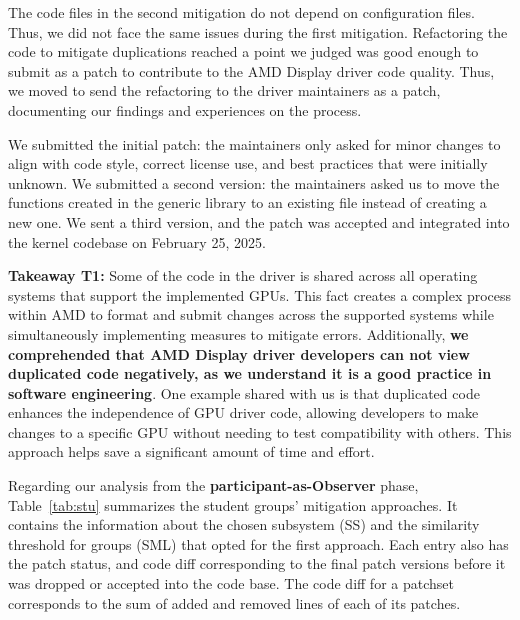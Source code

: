 \documentclass[10pt,conference]{IEEEtran}
\begin{document}
The code files in the second mitigation do not depend on configuration files. Thus, 
we did not face the same issues during the first mitigation. Refactoring the code 
to mitigate duplications reached a point we judged was good enough to submit as a 
patch to contribute to the AMD Display driver code quality. Thus, we moved to send 
the refactoring to the driver maintainers as a patch, documenting our findings and experiences 
on the process.

We submitted the initial patch: the maintainers only asked for minor changes to align with code style, correct license use, and best practices that were initially unknown. We submitted a second version: the maintainers asked us to move the functions created in the generic library to an existing file instead of creating a new one. We sent a third version, and the patch was accepted and integrated into the kernel codebase on February 25, 2025.

\noindent\textbf{Takeaway T1:} Some of the code in the driver is shared across all operating systems that support the implemented GPUs. This fact creates a complex process within AMD to format and submit changes across the supported systems while simultaneously implementing measures to mitigate errors. Additionally, \textbf{we comprehended that AMD Display driver developers can not view duplicated code negatively, as we understand it is a good practice in software engineering}. One example shared with us is that duplicated code enhances the independence of GPU driver code, allowing developers to make changes to a specific GPU without needing to test compatibility with others. This approach helps save a significant amount of time and effort.

Regarding our analysis from the \textbf{participant-as-Observer} phase, Table~\ref{tab:stu} summarizes the student groups' mitigation approaches. It contains the information about the chosen subsystem (SS) and the similarity threshold for groups (SML) that opted for the first approach. Each entry also has the patch status, and code diff corresponding to the final patch versions before it was dropped or accepted into the code base. The code diff for a patchset corresponds to the sum of added and removed lines of each of its patches.
\end{document}
